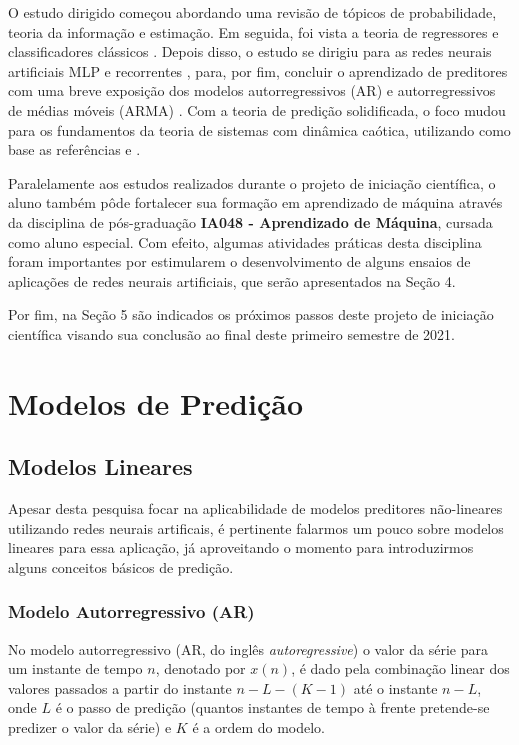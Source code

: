 \documentclass[a4paper, 12pt]{article}
\begin{document}
O estudo dirigido começou abordando uma revisão de tópicos de probabilidade, teoria da informação e estimação. Em seguida, foi vista a teoria de regressores e classificadores clássicos \cite{hastie2009elements}. Depois disso, o estudo se dirigiu para as redes neurais artificiais MLP e recorrentes \cite{geron2019hands}, para, por fim, concluir o aprendizado de preditores com uma breve exposição dos modelos autorregressivos (AR) e autorregressivos de médias móveis (ARMA) \cite{box2015time}. Com a teoria de predição solidificada, o foco mudou para os fundamentos da teoria de sistemas com dinâmica caótica, utilizando como base as referências \cite{fiedler1994caos} e \cite{attux2001dinamica}.

Paralelamente aos estudos realizados  durante o projeto de iniciação científica, o aluno também pôde fortalecer sua formação em aprendizado de máquina através da disciplina de pós-graduação \textbf{IA048 - Aprendizado de Máquina}, cursada como aluno especial. Com efeito, algumas atividades práticas desta disciplina foram importantes por estimularem o desenvolvimento de alguns ensaios de aplicações de redes neurais artificiais, que serão apresentados na Seção 4.

Por fim, na Seção 5 são indicados os próximos passos deste projeto de iniciação científica visando sua conclusão ao final deste primeiro semestre de 2021. 

\section{Modelos de Predição}

\subsection{Modelos Lineares}

Apesar desta pesquisa focar na aplicabilidade de modelos preditores não-lineares utilizando redes neurais artificais, é pertinente falarmos um pouco sobre modelos lineares para essa aplicação, já aproveitando o momento para introduzirmos alguns conceitos básicos de predição.

\subsubsection{Modelo Autorregressivo (AR)}

No modelo autorregressivo (AR, do inglês \textit{autoregressive}) o valor da série para um instante de tempo $n$, denotado por $x(n)$, é dado pela combinação linear dos valores passados a partir do instante $n - L - (K - 1)$ até o instante $n - L$, onde $L$ é o passo de predição (quantos instantes de tempo à frente pretende-se predizer o valor da série) e $K$ é a ordem do modelo. 
\end{document}
